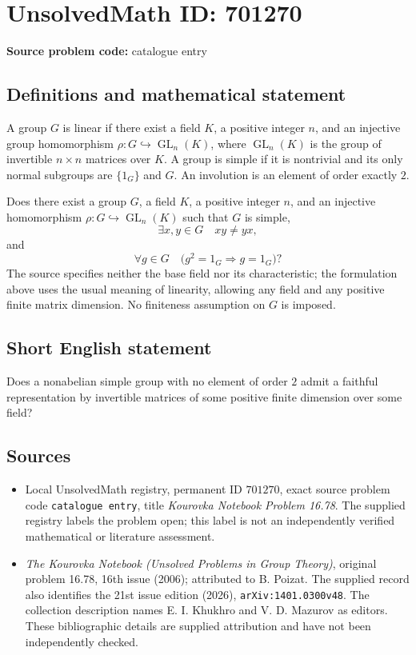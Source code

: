 \documentclass[11pt]{article}
\begin{document}
\section*{UnsolvedMath ID: 701270}
\textbf{Source problem code:} catalogue entry
\subsection{Definitions and mathematical statement}
A group \(G\) is linear if there exist a field \(K\), a positive integer \(n\), and an injective group homomorphism \(\rho\colon G\hookrightarrow \operatorname{GL}_n(K)\), where \(\operatorname{GL}_n(K)\) is the group of invertible \(n\times n\) matrices over \(K\). A group is simple if it is nontrivial and its only normal subgroups are \(\{1_G\}\) and \(G\). An involution is an element of order exactly \(2\).

Does there exist a group \(G\), a field \(K\), a positive integer \(n\), and an injective homomorphism \(\rho\colon G\hookrightarrow\operatorname{GL}_n(K)\) such that \(G\) is simple,
\[
\exists x,y\in G\quad xy\ne yx,
\]
and
\[
\forall g\in G\quad \bigl(g^2=1_G\Longrightarrow g=1_G\bigr)?
\]
The source specifies neither the base field nor its characteristic; the formulation above uses the usual meaning of linearity, allowing any field and any positive finite matrix dimension. No finiteness assumption on \(G\) is imposed.
\subsection{Short English statement}
Does a nonabelian simple group with no element of order \(2\) admit a faithful representation by invertible matrices of some positive finite dimension over some field?
\subsection{Sources}
\begin{itemize}
\item Local UnsolvedMath registry, permanent ID \(701270\), exact source problem code \texttt{catalogue entry}, title \emph{Kourovka Notebook Problem 16.78}. The supplied registry labels the problem open; this label is not an independently verified mathematical or literature assessment.
\item \emph{The Kourovka Notebook (Unsolved Problems in Group Theory)}, original problem 16.78, 16th issue (2006); attributed to B. Poizat. The supplied record also identifies the 21st issue edition (2026), \texttt{arXiv:1401.0300v48}. The collection description names E. I. Khukhro and V. D. Mazurov as editors. These bibliographic details are supplied attribution and have not been independently checked.
\end{itemize}
\end{document}
